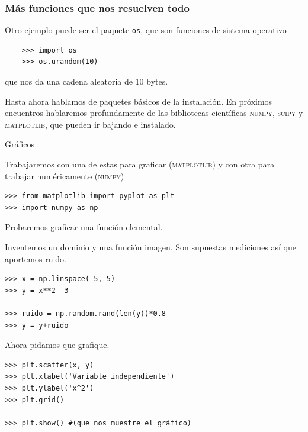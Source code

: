 \documentclass{beamer}
\begin{document}
\begin{frame}[fragile]
\frametitle{Más funciones que nos resuelven todo}
    Otro ejemplo puede ser el paquete \texttt{os}, que son funciones de sistema operativo
    \begin{verbatim}
    >>> import os
    >>> os.urandom(10)
    \end{verbatim}
    que nos da una cadena aleatoria de 10 bytes.

    Hasta ahora hablamos de paquetes básicos de la instalación. En próximos encuentros hablaremos profundamente de las bibliotecas científicas \textsc{numpy}, \textsc{scipy} y \textsc{matplotlib}, que pueden ir bajando e instalado.
\end{frame}


\begin{frame}[fragile]{Gráficos}

Trabajaremos con una de estas para graficar (\textsc{matplotlib})
y con otra para trabajar numéricamente (\textsc{numpy})
\begin{verbatim}
>>> from matplotlib import pyplot as plt
>>> import numpy as np
\end{verbatim}

Probaremos graficar una función elemental.
\end{frame}

\begin{frame}[fragile]

Inventemos un dominio y una función imagen. Son supuestas mediciones así que aportemos ruido.

\begin{verbatim}
>>> x = np.linspace(-5, 5)
>>> y = x**2 -3

>>> ruido = np.random.rand(len(y))*0.8
>>> y = y+ruido
\end{verbatim}
\end{frame}

\begin{frame}[fragile]

Ahora pidamos que grafique.

\begin{verbatim}
>>> plt.scatter(x, y)
>>> plt.xlabel('Variable independiente')
>>> plt.ylabel('x^2')
>>> plt.grid()

>>> plt.show() #(que nos muestre el gráfico)
\end{verbatim}
\end{frame}
\end{document}
